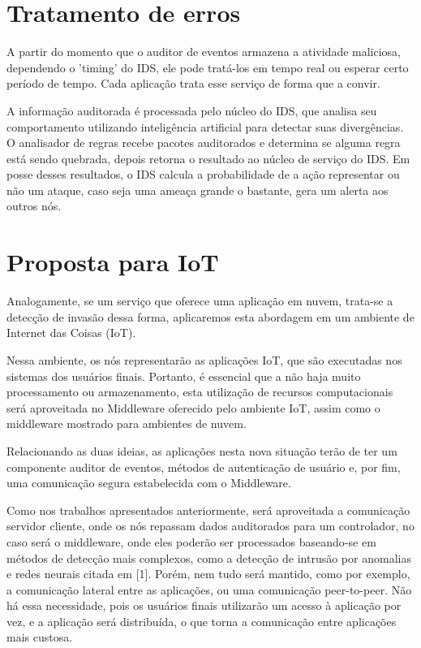 \documentclass[journal]{IEEEtran}
\begin{document}
\section{Tratamento de erros}
A partir do momento que o auditor de eventos armazena a atividade maliciosa, dependendo o 'timing' do IDS, ele pode tratá-los em tempo real ou esperar certo período de tempo. Cada aplicação trata esse serviço de forma que a convir. \par
A informação auditorada é processada pelo núcleo do IDS, que analisa seu comportamento utilizando inteligência artificial para detectar suas divergências. O analisador de regras recebe pacotes auditorados e determina se alguma regra está sendo quebrada, depois retorna o resultado ao núcleo de serviço do IDS. Em posse desses resultados, o IDS calcula a probabilidade de a ação representar ou não um ataque, caso seja uma ameaça grande o bastante, gera um alerta aos outros nós.

\section{Proposta para IoT}
Analogamente, se um serviço que oferece uma aplicação em nuvem, trata-se a detecção de invasão dessa forma, aplicaremos esta abordagem em um ambiente de Internet das Coisas (IoT). \par
Nessa ambiente, os nós representarão as aplicações IoT, que são executadas nos sistemas dos usuários finais. Portanto, é essencial que a não haja muito processamento ou armazenamento, esta utilização de recursos computacionais será aproveitada no Middleware oferecido pelo ambiente IoT, assim como o middleware mostrado para ambientes de nuvem. \par
Relacionando as duas ideias, as aplicações nesta nova situação terão de ter um componente auditor de eventos, métodos de autenticação de usuário e, por fim, uma comunicação segura estabelecida com o Middleware. \par
Como nos trabalhos apresentados anteriormente, será aproveitada a comunicação servidor cliente, onde os nós repassam dados auditorados para um controlador, no caso será o middleware, onde eles poderão ser processados baseando-se em métodos de detecção mais complexos, como a detecção de intrusão por anomalias e redes neurais citada em [1]. Porém, nem tudo será mantido, como por exemplo, a comunicação lateral entre as aplicações, ou uma comunicação peer-to-peer. Não há essa necessidade, pois os usuários finais utilizarão um acesso à aplicação por vez, e a aplicação será distribuída, o que torna a comunicação entre aplicações mais custosa. \par
\end{document}
